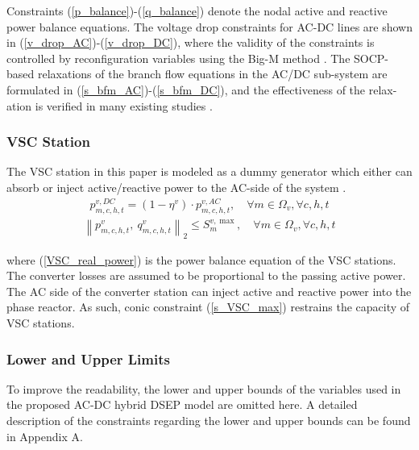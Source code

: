 \documentclass[a4paper,fleqn]{cas-dc}
\begin{document}
Constraints (\ref{p_balance})-(\ref{q_balance}) denote the nodal active and 
reactive power balance equations. The voltage drop constraints for AC-DC 
lines are shown in (\ref{v_drop_AC})-(\ref{v_drop_DC}), where the 
validity of the constraints is controlled by reconfiguration variables using 
the Big-M method \cite{Wu_2018_bi-level}.
{\color{blue}
The SOCP-based relaxations of 
the branch flow equations in the AC/DC sub-system are formulated in 
(\ref{s_bfm_AC})-(\ref{s_bfm_DC}), and the effectiveness of the relax-ation
is verified in many existing studies 
\cite{Ergun_2019_Optimal,Wu_2018_bi-level,Baradar_2013_Second}.
}

\vspace{3mm}

{\color{blue}
\subsubsection{VSC Station}
}

{\color{blue}
The VSC station in this paper is modeled as a dummy generator which either can 
absorb or inject active/reactive power to the AC-side of the system
\cite{Lotfi_2017_AC,Wu_2018_bi-level}.
\begin{align}
    \label{VSC_real_power}
    p_{m,c,h,t}^{v, DC} = (1 - \eta^{v}) \cdot p_{m,c,h,t}^{v, AC},
    \quad \forall m \in \Omega_{v}, \forall c,h,t
\end{align}
\begin{align}
    \label{s_VSC_max}
    \left\| p_{m,c,h,t}^{v}, \ q_{m,c,h,t}^{v} \right\|_{2} 
    \leq S_{m}^{v, \max},
    \quad \forall m \in \Omega_{v}, \forall c,h,t
\end{align}

\noindent where (\ref{VSC_real_power}) is the power balance equation of the VSC 
stations. The converter losses are assumed to be proportional to the passing 
active power. The AC side of the converter station can inject active and 
reactive power into the phase reactor. As such, conic constraint 
(\ref{s_VSC_max}) restrains the capacity of VSC stations.
}

\vspace{3mm}

{\color{blue}
\subsubsection{Lower and Upper Limits}
}

{\color{blue}
To improve the readability, the lower and upper bounds of the variables used 
in the proposed AC-DC hybrid DSEP model are omitted here. A detailed 
description of the constraints regarding the lower and upper bounds can be 
found in Appendix A.
}
\end{document}
